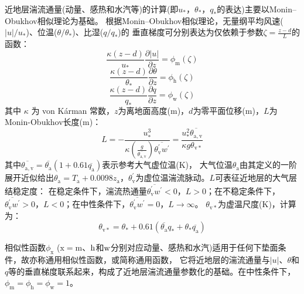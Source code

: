 近地层湍流通量(动量、感热和水汽等)的计算(即$u_\ast$，$\theta_\ast$，$q_\ast$的表达)主要以Monin--Obukhov相似理论为基础。
根据Monin--Obukhov相似理论，无量纲平均风速($\left|u\right|/u_\ast$)、位温($\theta/\theta_\ast$)、比湿($q/q_\ast$)的
垂直梯度可分别表达为仅依赖于参数$\zeta=\frac{z-d}{L}$的函数：
\begin{equation}\label{kz_u}
  \frac{\kappa (z-d)}{u_{*}} \frac{\partial|u|}{\partial z}=\phi_{\mathrm{m}}(\zeta)
\end{equation}
\begin{equation}\label{kz_theta}
  \frac{\kappa (z-d)}{\theta_{*}} \frac{\partial \theta}{\partial z}=\phi_{\mathrm{h}}(\zeta)
\end{equation}
\begin{equation}\label{kz_q}
  \frac{\kappa (z-d)}{q_{*}} \frac{\partial q}{\partial z}=\phi_{\mathrm{w}}(\zeta)
\end{equation}
其中 $\kappa$ 为 von K\'arman 常数，$z$为离地面高度(m)，$d$为零平面位移(m)，$L$为Monin-Obukhov长度(m)：
\begin{equation}\label{ObukL}
  L=-\frac{u_{*}^{3}}{\kappa \left(\frac{g}{\overline{\theta_{\mathrm{a,v}}}}\right) \overline{\theta_{\mathrm{v}}^{\prime} w^{\prime}}}=\frac{u_{*}^{2} \overline{\theta_{\mathrm{a,v}}}}{\kappa g \theta_{\mathrm{v *}}}
\end{equation}
其中$\overline{\theta_{\mathrm{a,v}}}=\overline{\theta_{\mathrm{a}}}(1+0.61\overline{q_{\mathrm{a}}})$表示参考大气虚位温(K)，
大气位温$\theta_{\mathrm{a}}$由其定义的一阶展开近似给出$\theta_{\mathrm{a}}=T_{\mathrm{a}}+0.0098z_{\mathrm{a}}$，$\theta_{\mathrm{v}}^{\prime}$为虚位温湍流脉动。$L$可表征近地层的大气层结稳定度：
在稳定条件下，湍流热通量$\overline{\theta_{\mathrm v}^\prime w^\prime}<0$，$L>0$；在不稳定条件下，
$\overline{\theta_{\mathrm v}^\prime w^\prime}>0$，$L<0$；在中性条件下，$\overline{\theta_{\mathrm v}^\prime w^\prime}=0$，$L\rightarrow\infty$。
$\theta_{\mathrm{v\ast}}$为虚温尺度(K)，计算为：
\begin{equation}\label{thvstar}
  \theta_{\mathrm{v\ast}}=\theta_\ast+0.61(\overline{\theta_{\mathrm{a}}}q_\ast + \theta_\ast\overline{q_{\mathrm{a}}})
\end{equation}

相似性函数$\phi_{\mathrm x}$ ($\mathrm{x=m}$、$\rm h$和$\rm w$分别对应动量、感热和水汽)适用于任何下垫面条件，故亦称通用相似性函数，或简称通用函数，
它将近地层的湍流通量与$\left|u\right|$、$\theta$和$q$等的垂直梯度联系起来，构成了近地层湍流通量参数化的基础。在中性条件下，$\phi_{\mathrm m}=\phi_{\mathrm h}=\phi_{\mathrm w}=1$。



